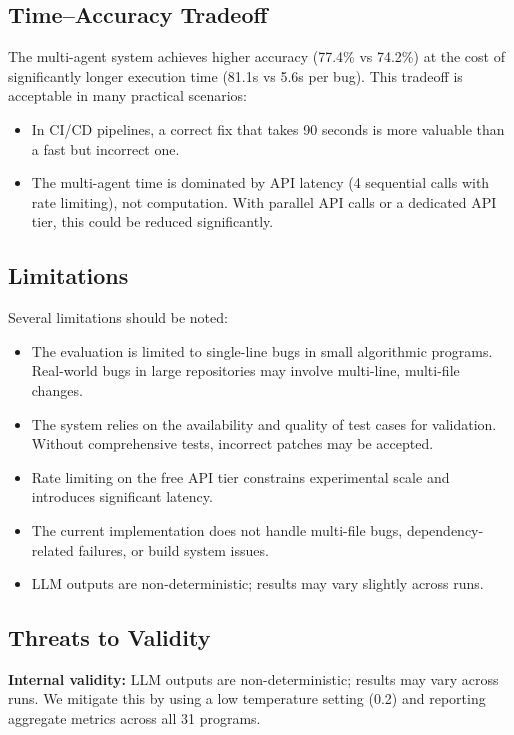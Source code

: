 \documentclass[conference]{IEEEtran}
\begin{document}
\subsection{Time--Accuracy Tradeoff}
The multi-agent system achieves higher accuracy (77.4\% vs 74.2\%) at the cost of significantly longer execution time (81.1s vs 5.6s per bug). This tradeoff is acceptable in many practical scenarios:
\begin{itemize}
    \item In CI/CD pipelines, a correct fix that takes 90 seconds is more valuable than a fast but incorrect one.
    \item The multi-agent time is dominated by API latency (4 sequential calls with rate limiting), not computation. With parallel API calls or a dedicated API tier, this could be reduced significantly.
\end{itemize}

\subsection{Limitations}
Several limitations should be noted:
\begin{itemize}
    \item The evaluation is limited to single-line bugs in small algorithmic programs. Real-world bugs in large repositories may involve multi-line, multi-file changes.
    \item The system relies on the availability and quality of test cases for validation. Without comprehensive tests, incorrect patches may be accepted.
    \item Rate limiting on the free API tier constrains experimental scale and introduces significant latency.
    \item The current implementation does not handle multi-file bugs, dependency-related failures, or build system issues.
    \item LLM outputs are non-deterministic; results may vary slightly across runs.
\end{itemize}

\subsection{Threats to Validity}
\textbf{Internal validity:} LLM outputs are non-deterministic; results may vary across runs. We mitigate this by using a low temperature setting (0.2) and reporting aggregate metrics across all 31 programs.
\end{document}
